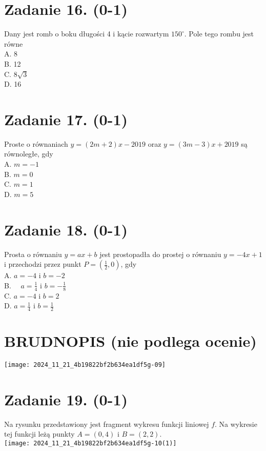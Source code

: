 \documentclass[10pt]{article}
\begin{document}
\section*{Zadanie 16. (0-1)}
Dany jest romb o boku długości 4 i kącie rozwartym \(150^{\circ}\). Pole tego rombu jest równe\\
A. 8\\
B. 12\\
C. \(8 \sqrt{3}\)\\
D. 16

\section*{Zadanie 17. (0-1)}
Proste o równaniach \(y=(2 m+2) x-2019\) oraz \(y=(3 m-3) x+2019\) są równoległe, gdy\\
A. \(m=-1\)\\
B. \(m=0\)\\
C. \(m=1\)\\
D. \(m=5\)

\section*{Zadanie 18. (0-1)}
Prosta o równaniu \(y=a x+b\) jest prostopadła do prostej o równaniu \(y=-4 x+1\) i przechodzi przez punkt \(P=\left(\frac{1}{2}, 0\right)\), gdy\\
A. \(a=-4\) i \(b=-2\)\\
B. \(\quad a=\frac{1}{4}\) i \(b=-\frac{1}{8}\)\\
C. \(a=-4\) i \(b=2\)\\
D. \(a=\frac{1}{4}\) i \(b=\frac{1}{2}\)

\section*{BRUDNOPIS (nie podlega ocenie)}
\begin{center}
\texttt{[image: 2024\_11\_21\_4b19822bf2b634ea1df5g-09]}
\end{center}

\section*{Zadanie 19. (0-1)}
Na rysunku przedstawiony jest fragment wykresu funkcji liniowej \(f\). Na wykresie tej funkcji leżą punkty \(A=(0,4)\) i \(B=(2,2)\).\\
\texttt{[image: 2024\_11\_21\_4b19822bf2b634ea1df5g-10(1)]}
\end{document}
